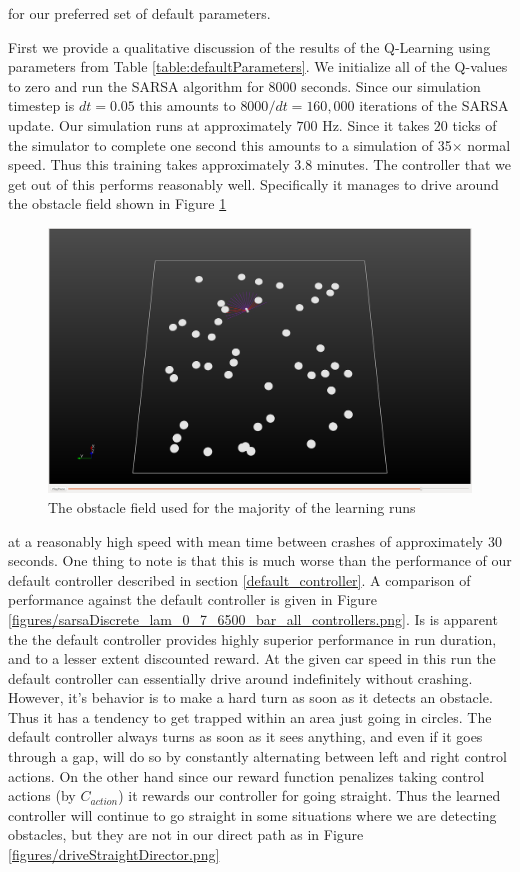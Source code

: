 \documentclass{article}
\begin{document}
for our preferred set of default parameters.

First we provide a qualitative discussion of the results of the Q-Learning using parameters from Table \ref{table:defaultParameters}. We initialize all of the Q-values to zero and run the SARSA algorithm for 8000 seconds. Since our simulation timestep is $dt = 0.05$ this amounts to $8000/dt = 160,000$ iterations of the SARSA update. Our simulation runs at approximately $700$ Hz. Since it takes $20$ ticks of the simulator to complete one second this amounts to a simulation of 35$\times$ normal speed. Thus this training takes approximately $3.8$ minutes. The controller that we get out of this performs reasonably well. Specifically it manages to drive around the obstacle field shown in Figure \ref{figures/director.png}
%
%
\begin{figure}
\centering
\includegraphics[scale=0.2]{figures/director.png}
\caption{The obstacle field used for the majority of the learning runs}
\label{figures/director.png}
\end{figure}
%
%
 at a reasonably high speed with mean time between crashes of approximately 30 seconds. One thing to note is that this is much worse than the performance of our default controller described in section \ref{default_controller}. A comparison of performance against the default controller is given in Figure \ref{figures/sarsaDiscrete_lam_0_7_6500_bar_all_controllers.png}. Is is apparent the the default controller provides highly superior performance in run duration, and to a lesser extent discounted reward. At the given car speed in this run the default controller can essentially drive around indefinitely without crashing. However, it's behavior is to make a hard turn as soon as it detects an obstacle. Thus it has a tendency to get trapped within an area just going in circles. The default controller always turns as soon as it sees anything, and even if it goes through a gap, will do so by constantly alternating between left and right control actions. On the other hand since our reward function penalizes taking control actions (by $C_{action}$) it rewards our controller for going straight. Thus the learned controller will continue to go straight in some situations where we are detecting obstacles, but they are not in our direct path as in Figure \ref{figures/driveStraightDirector.png}
\end{document}

